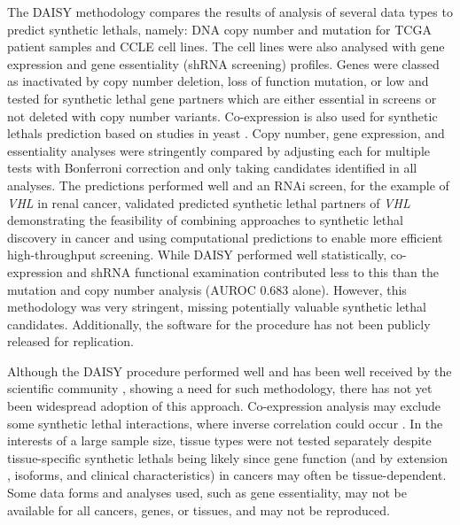 The \gls{DAISY} methodology \citep{Jerby2014} compares the results of analysis of several data types to predict \glspl{synthetic lethal}, namely: \acrshort{DNA} copy number and  \gls{mutation} for \gls{TCGA} patient samples and CCLE cell lines. The cell lines were also analysed with \gls{gene expression} and gene essentiality (\gls{shRNA} screening) profiles. Genes were classed as inactivated by copy number deletion,  loss of function \gls{mutation}, or low  and tested for \gls{synthetic lethal} gene partners which are either \gls{essential} in screens or not deleted with copy number variants. Co-expression is also used for \glspl{synthetic lethal} prediction based on studies in yeast \citep{Costanzo2010, Kelley2005}. Copy number, \gls{gene expression}, and essentiality analyses were stringently compared by adjusting each for multiple tests with Bonferroni correction and only taking candidates identified in all analyses. 
The predictions performed well and an \gls{RNAi} screen, for the example of \textit{VHL} in renal cancer, validated predicted \gls{synthetic lethal} partners of \textit{VHL} demonstrating the feasibility of combining approaches to \gls{synthetic lethal} discovery in cancer and using computational predictions to enable more efficient high-throughput screening. While \gls{DAISY} performed well statistically, co-expression and \gls{shRNA} functional examination contributed less to this than the \gls{mutation} and copy number analysis (\gls{AUROC} 0.683 alone). However, this methodology was very stringent, missing potentially valuable \gls{synthetic lethal} candidates. %
Additionally, the software for the procedure has not been publicly released for replication.  

Although the \gls{DAISY} procedure performed well and has been well received by the scientific community \citep{Crunkhorn2014, Lokody2014, Ryan2014}, showing a need for such methodology, there has not yet been widespread adoption of this approach. Co-expression analysis may exclude some \gls{synthetic lethal} interactions, where inverse correlation could occur \citep{Lu2015}. In the interests of a large sample size, tissue types were not tested separately despite tissue-specific \glspl{synthetic lethal} being likely since gene function (and by extension , isoforms, and clinical characteristics) in cancers may often be tissue-dependent. Some data forms and analyses used, such as gene essentiality, may not be available for all cancers, genes, or tissues, and may not be reproduced.  

